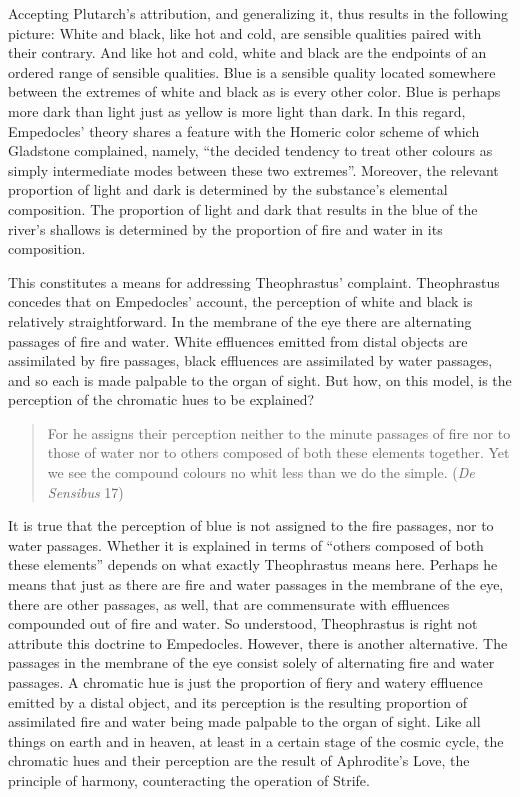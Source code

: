 Accepting Plutarch's attribution, and generalizing it, thus results in the following picture: White and black, like hot and cold, are sensible qualities paired with their contrary. And like hot and cold, white and black are the endpoints of an ordered range of sensible qualities. Blue is a sensible quality located somewhere between the extremes of white and black as is every other color. Blue is perhaps more dark than light just as yellow is more light than dark. In this regard, Empedocles' theory shares a feature with the Homeric color scheme of which Gladstone complained, namely, ``the decided tendency to treat other colours as simply intermediate modes between these two extremes''. Moreover, the relevant proportion of light and dark is determined by the substance's elemental composition. The proportion of light and dark that results in the blue of the river's shallows is determined by the proportion of fire and water in its composition.

This constitutes a means for addressing Theophrastus' complaint. Theo\-phrastus concedes that on Empedocles' account, the perception of white and black is relatively straightforward. In the membrane of the eye there are alternating passages of fire and water. White effluences emitted from distal objects are assimilated by fire passages, black effluences are assimilated by water passages, and so each is made palpable to the organ of sight. But how, on this model, is the perception of the chromatic hues to be explained?
\begin{quote}
	For he assigns their perception neither to the minute passages of fire nor to those of water nor to others composed of both these elements together. Yet we see the compound colours no whit less than we do the simple. (\emph{De Sensibus} 17)
\end{quote}

It is true that the perception of blue is not assigned to the fire passages, nor to water passages. Whether it is explained in terms of ``others composed of both these elements'' depends on what exactly Theophrastus means here. Perhaps he means that just as there are fire and water passages in the membrane of the eye, there are other passages, as well, that are commensurate with effluences compounded out of fire and water. So understood, Theophrastus is right not attribute this doctrine to Empedocles. However, there is another alternative. The passages in the membrane of the eye consist solely of alternating fire and water passages. A chromatic hue is just the proportion of fiery and watery effluence emitted by a distal object, and its perception is the resulting proportion of assimilated fire and water being made palpable to the organ of sight. Like all things on earth and in heaven, at least in a certain stage of the cosmic cycle, the chromatic hues and their perception are the result of Aphrodite's Love, the principle of harmony, counteracting the operation of Strife. \change

